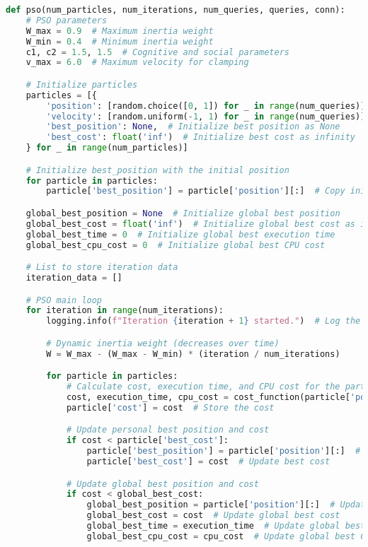 \begin{lstlisting}[language=Python]
def pso(num_particles, num_iterations, num_queries, queries, conn):
    # PSO parameters
    W_max = 0.9  # Maximum inertia weight
    W_min = 0.4  # Minimum inertia weight
    c1, c2 = 1.5, 1.5  # Cognitive and social parameters
    v_max = 6.0  # Maximum velocity for clamping

    # Initialize particles
    particles = [{
        'position': [random.choice([0, 1]) for _ in range(num_queries)],  # Randomly initialize position (0 or 1)
        'velocity': [random.uniform(-1, 1) for _ in range(num_queries)],  # Randomly initialize velocity
        'best_position': None,  # Initialize best position as None
        'best_cost': float('inf')  # Initialize best cost as infinity
    } for _ in range(num_particles)]

    # Initialize best_position with the initial position
    for particle in particles:
        particle['best_position'] = particle['position'][:]  # Copy initial position

    global_best_position = None  # Initialize global best position
    global_best_cost = float('inf')  # Initialize global best cost as infinity
    global_best_time = 0  # Initialize global best execution time
    global_best_cpu_cost = 0  # Initialize global best CPU cost

    # List to store iteration data
    iteration_data = []

    # PSO main loop
    for iteration in range(num_iterations):
        logging.info(f"Iteration {iteration + 1} started.")  # Log the start of the iteration

        # Dynamic inertia weight (decreases over time)
        W = W_max - (W_max - W_min) * (iteration / num_iterations)

        for particle in particles:
            # Calculate cost, execution time, and CPU cost for the particle's position
            cost, execution_time, cpu_cost = cost_function(particle['position'], queries, conn)
            particle['cost'] = cost  # Store the cost

            # Update personal best position and cost
            if cost < particle['best_cost']:
                particle['best_position'] = particle['position'][:]  # Update best position
                particle['best_cost'] = cost  # Update best cost

            # Update global best position and cost
            if cost < global_best_cost:
                global_best_position = particle['position'][:]  # Update global best position
                global_best_cost = cost  # Update global best cost
                global_best_time = execution_time  # Update global best execution time
                global_best_cpu_cost = cpu_cost  # Update global best CPU cost


\end{lstlisting}
